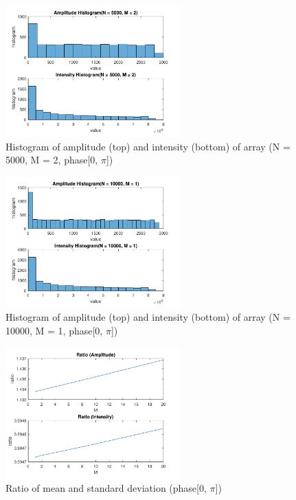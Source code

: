 \documentclass{article}
\begin{document}
\begin{figure}[H]
	\centering
	\includegraphics[width = 0.6\textwidth]{src/pi/hist_5000_2.pdf}
	\caption{Histogram of amplitude (top) and intensity (bottom) of array (N = 5000, M = 2, phase[0, $\pi$])}
	\label{fig:hist-5000-2-pi}
\end{figure}
\begin{figure}[H]
	\centering
	\includegraphics[width = 0.6\textwidth]{src/pi/hist_10000_1.pdf}
	\caption{Histogram of amplitude (top) and intensity (bottom) of array (N = 10000, M = 1, phase[0, $\pi$])}
	\label{fig:hist-10000-1-pi}
\end{figure}

\begin{figure}[H]
	\centering
	\includegraphics[width = 0.6\textwidth]{src/pi/ratio.pdf}
	\caption{Ratio of mean and standard deviation (phase[0, $\pi$])}
	\label{fig:ratio-pi}
\end{figure}
\end{document}
